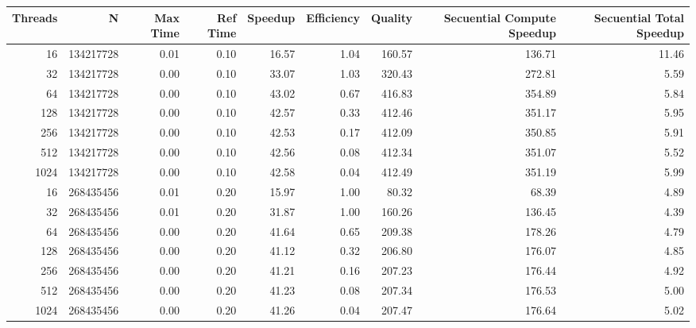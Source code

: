         \begin{table}[H]
            \centering
            \begin{adjustbox}{width=\textwidth, keepaspectratio}
                \begin{tabular}{rrrrrrrrr}
                    \toprule
                    Threads & N & Max Time & Ref Time & Speedup & Efficiency & Quality & Secuential Compute Speedup & Secuential Total Speedup \\
                    \midrule
                    16 & 134217728 & 0.01 & 0.10 & 16.57 & 1.04 & 160.57 & 136.71 & 11.46 \\
                    32 & 134217728 & 0.00 & 0.10 & 33.07 & 1.03 & 320.43 & 272.81 & 5.59 \\
                    64 & 134217728 & 0.00 & 0.10 & 43.02 & 0.67 & 416.83 & 354.89 & 5.84 \\
                    128 & 134217728 & 0.00 & 0.10 & 42.57 & 0.33 & 412.46 & 351.17 & 5.95 \\
                    256 & 134217728 & 0.00 & 0.10 & 42.53 & 0.17 & 412.09 & 350.85 & 5.91 \\
                    512 & 134217728 & 0.00 & 0.10 & 42.56 & 0.08 & 412.34 & 351.07 & 5.52 \\
                    1024 & 134217728 & 0.00 & 0.10 & 42.58 & 0.04 & 412.49 & 351.19 & 5.99 \\
                    
                    16 & 268435456 & 0.01 & 0.20 & 15.97 & 1.00 & 80.32 & 68.39 & 4.89 \\
                    32 & 268435456 & 0.01 & 0.20 & 31.87 & 1.00 & 160.26 & 136.45 & 4.39 \\
                    64 & 268435456 & 0.00 & 0.20 & 41.64 & 0.65 & 209.38 & 178.26 & 4.79 \\
                    128 & 268435456 & 0.00 & 0.20 & 41.12 & 0.32 & 206.80 & 176.07 & 4.85 \\
                    256 & 268435456 & 0.00 & 0.20 & 41.21 & 0.16 & 207.23 & 176.44 & 4.92 \\
                    512 & 268435456 & 0.00 & 0.20 & 41.23 & 0.08 & 207.34 & 176.53 & 5.00 \\
                    1024 & 268435456 & 0.00 & 0.20 & 41.26 & 0.04 & 207.47 & 176.64 & 5.02 \\


\end{tabular}
\end{adjustbox}
\end{table}
